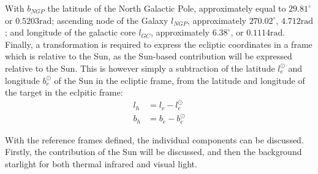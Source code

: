 With $b_{NGP}$ the latitude of the North Galactic Pole, approximately equal to $29.81^\circ$ or $0.5203 \mathrm{rad}$; ascending node of the Galaxy $l_{NGP}$, approximately $270.02^\circ$, $4.712 \mathrm{rad}$; and longitude of the galactic core $l_{GC}$, approximately $6.38^\circ$, or $0.1114 \mathrm{rad}$. Finally, a transformation is required to express the ecliptic coordinates in a frame which is relative to the Sun, as the Sun-based contribution will be expressed relative to the Sun. This is however simply a subtraction of the latitude $l_e^\odot$ and longitude $b_e^\odot$ of the Sun in the ecliptic frame, from the latitude and longitude of the target in the eclpitic frame:
\begin{align}
 l_h &= l_e - l_e^\odot \\
 b_h &= b_e - b_e^\odot
\end{align}

With the reference frames defined, the individual components can be discussed. Firstly, the contribution of the Sun will be discussed, and then the background starlight for both thermal infrared and visual light.

